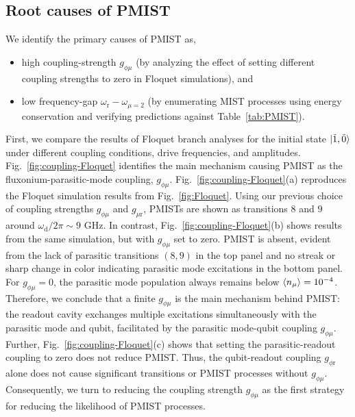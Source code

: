 \documentclass[%
reprint,
superscriptaddress,
 amsmath,amssymb,
 aps,
 prx,
longbibliography,
floatfix,
]{revtex4-2}
\begin{document}
\subsection{Root causes of PMIST}\label{sec:coupling}

We identify the primary causes of PMIST as,
\begin{itemize}
    \item high coupling-strength $g_{\phi\mu}$ (by analyzing the effect of setting different coupling strengths to zero in Floquet simulations), and
    \item low frequency-gap $\omega_\mathrm{r}-\omega_{\mu=2}$ (by enumerating MIST processes using energy conservation and verifying predictions against Table~\ref{tab:PMIST}).
\end{itemize}

First, we compare the results of Floquet branch analyses for the initial state $\ket{\tilde{1}, \tilde{0}}$ under different coupling conditions, drive frequencies, and amplitudes. Fig.~\ref{fig:coupling-Floquet} identifies the main mechanism causing PMIST as the fluxonium-parasitic-mode coupling, $g_{\phi \mu}$. Fig.~\ref{fig:coupling-Floquet}(a) reproduces the Floquet simulation results from Fig.~\ref{fig:Floquet}. Using our previous choice of coupling strengths $g_{\phi\mu}$ and $g_{\mu \textrm{r}}$, PMISTs are shown as transitions $8$ and $9$ around $\omega_\textrm{d}/2\pi \sim 9$ GHz. In contrast, Fig.~\ref{fig:coupling-Floquet}(b) shows results from the same simulation, but with $g_{\phi \mu}$ set to zero. PMIST is absent, evident from the lack of parasitic transitions $(8,9)$ in the top panel and no streak or sharp change in color indicating parasitic mode excitations in the bottom panel. For $g_{\phi \mu}=0$, the parasitic mode population always remains below $\braket{n_\mu}=10^{-4}$. Therefore, we conclude that a finite $g_{\phi\mu}$ is the main mechanism behind PMIST: the readout cavity exchanges multiple excitations simultaneously with the parasitic mode and qubit, facilitated by the parasitic mode-qubit coupling $g_{\phi \mu}$. Further, Fig.~\ref{fig:coupling-Floquet}(c) shows that setting the parasitic-readout coupling to zero does not reduce PMIST. Thus, the qubit-readout coupling $g_{\phi \textrm{r}}$ alone does not cause significant transitions or PMIST processes without $g_{\phi \mu}$. Consequently, we turn to reducing the coupling strength $g_{\phi \mu}$ as the first strategy for reducing the likelihood of PMIST processes.
\end{document}

